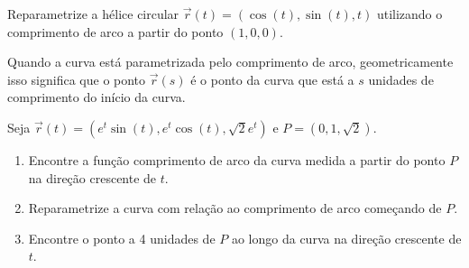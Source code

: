 \begin{frame}[label=fun-vet]
\begin{exe}
Reparametrize a hélice circular $\vec{r}(t)=(\cos(t),\sin(t),t)$ utilizando o comprimento de arco a partir do ponto $(1,0,0)$.
\end{exe}


\begin{block}{}
Quando a curva está parametrizada pelo comprimento de arco, geometricamente isso significa que o ponto $\vec{r}(s)$  é o ponto da curva que está a $s$ unidades de comprimento do início da curva.
\end{block}
\end{frame}

\begin{frame}[label=fun-vet]
\begin{casa}
Seja $\vec{r}(t)=(e^t\sin(t),e^t\cos(t),\sqrt{2}e^t)$ e $P=(0,1,\sqrt{2})$. 
\begin{enumerate}
\item Encontre a função comprimento de arco da curva medida a partir do ponto $P$ na direção crescente de $t$.
\item Reparametrize a curva com relação ao comprimento de arco começando de $P$.
\item Encontre o ponto a 4 unidades de $P$ ao longo da curva na direção crescente de $t$.
\end{enumerate}
\end{casa}
\end{frame}

